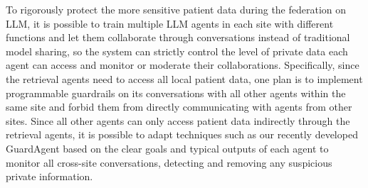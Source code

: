 To rigorously protect the more sensitive patient data during the federation on LLM, it is possible to train multiple LLM agents in each site with different functions and let them collaborate through conversations instead of traditional model sharing, so the system can strictly control the level of private data each agent can access and monitor or moderate their collaborations. 
Specifically, since the retrieval agents need to access all local patient data, one plan is to implement programmable guardrails \cite{rebedea2023nemo} on its conversations with all other agents within the same site and forbid them from directly communicating with agents from other sites. Since all other agents can only access patient data indirectly through the retrieval agents, it is possible to adapt techniques such as our recently developed GuardAgent \cite{xiang2024guardagent} based on the clear goals and typical outputs of each agent to monitor all cross-site conversations, detecting and removing any suspicious private information.

